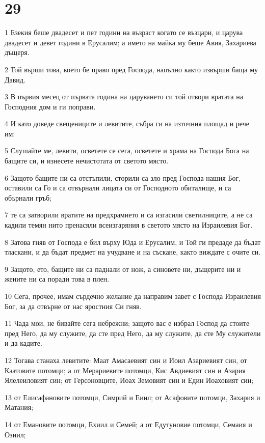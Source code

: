 \chapter{29}

\par 1 Езекия беше двадесет и пет години на възраст когато се възцари, и царува двадесет и девет години в Ерусалим; а името на майка му беше Авия, Захариева дъщеря.
\par 2 Той върши това, което бе право пред Господа, напълно както извърши баща му Давид.
\par 3 В първия месец от първата година на царуването си той отвори вратата на Господния дом и ги поправи.
\par 4 И като доведе свещениците и левитите, събра ги на източния площад и рече им:
\par 5 Слушайте ме, левити, осветете се сега, осветете и храма на Господа Бога на бащите си, и изнесете нечистотата от светото място.
\par 6 Защото бащите ни са отстъпили, сторили са зло пред Господа нашия Бог, оставили са Го и са отвърнали лицата си от Господното обиталище, и са обърнали гръб;
\par 7 те са затворили вратите на предхрамието и са изгасили светилниците, а не са кадили темян нито пренасяли всеизгаряния в светото място на Израилевия Бог.
\par 8 Затова гняв от Господа е бил върху Юда и Ерусалим, и Той ги предаде да бъдат тласкани, и да бъдат предмет на учудване и на съскане, както виждате с очите си.
\par 9 Защото, ето, бащите ни са паднали от нож, а синовете ни, дъщерите ни и жените ни са поради това в плен.
\par 10 Сега, прочее, имам сърдечно желание да направим завет с Господа Израилевия Бог, за да отвърне от нас яростния Си гняв.
\par 11 Чада мои, не бивайте сега небрежни; защото вас е избрал Господ да стоите пред Него, да му служите, да сте пред Него, да му служите, да сте Му служители и да кадите.
\par 12 Тогава станаха левитите: Маат Амасаевият син и Иоил Азариевият син, от Каатовите потомци; а от Мерариевите потомци, Кис Авдиевият син и Азария Ялелеиловият син; от Герсоновците, Иоах Земовият син и Един Иоаховият син;
\par 13 от Елисафановите потомци, Симрий и Еиил; от Асафовите потомци, Захария и Матания;
\par 14 от Емановите потомци, Ехиил и Семей; а от Едутуновие потомци, Семаия и Озиил;
